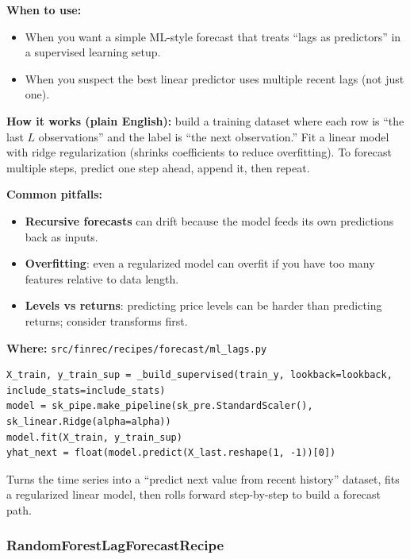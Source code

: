 \documentclass[11pt,a4paper]{article}
\begin{document}
\textbf{When to use:}
\begin{itemize}[leftmargin=2em]
  \item When you want a simple ML-style forecast that treats ``lags as predictors'' in a supervised learning setup.
  \item When you suspect the best linear predictor uses multiple recent lags (not just one).
\end{itemize}

\textbf{How it works (plain English):} build a training dataset where each row is ``the last \(L\) observations'' and the label is ``the next observation.'' Fit a linear model with ridge regularization (shrinks coefficients to reduce overfitting). To forecast multiple steps, predict one step ahead, append it, then repeat.

\textbf{Common pitfalls:}
\begin{itemize}[leftmargin=2em]
  \item \textbf{Recursive forecasts} can drift because the model feeds its own predictions back as inputs.
  \item \textbf{Overfitting}: even a regularized model can overfit if you have too many features relative to data length.
  \item \textbf{Levels vs returns}: predicting price levels can be harder than predicting returns; consider transforms first.
\end{itemize}

\textbf{Where:} \texttt{src/finrec/recipes/forecast/ml\_lags.py}

\begin{lstlisting}
X_train, y_train_sup = _build_supervised(train_y, lookback=lookback, include_stats=include_stats)
model = sk_pipe.make_pipeline(sk_pre.StandardScaler(), sk_linear.Ridge(alpha=alpha))
model.fit(X_train, y_train_sup)
yhat_next = float(model.predict(X_last.reshape(1, -1))[0])
\end{lstlisting}

\begin{intuitionbox}
Turns the time series into a ``predict next value from recent history'' dataset, fits a regularized linear model, then rolls forward step-by-step to build a forecast path.
\end{intuitionbox}

\subsubsection{RandomForestLagForecastRecipe}\label{sec:rf}
\end{document}
